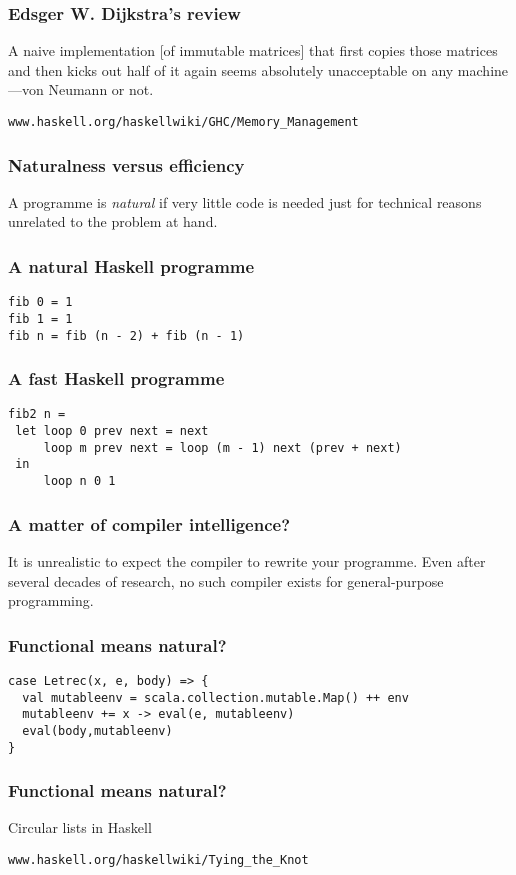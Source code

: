 \documentclass{beamer}
\begin{document}
\begin{frame}[fragile]
\frametitle{Edsger W. Dijkstra's review}
A naive implementation [of immutable matrices] that first copies those
matrices and then kicks out half of it again seems absolutely
unacceptable on any machine---von Neumann or not.

\pause
\begin{verbatim}
www.haskell.org/haskellwiki/GHC/Memory_Management
\end{verbatim}
\end{frame}

\begin{frame}
\frametitle{Naturalness versus efficiency}
A programme is \emph{natural} if very little code is needed just for
technical reasons unrelated to the problem at hand.
\end{frame}

\begin{frame}[fragile]
\frametitle{A natural Haskell programme}
\begin{verbatim}
fib 0 = 1
fib 1 = 1
fib n = fib (n - 2) + fib (n - 1)
\end{verbatim}
\end{frame}

\begin{frame}[fragile]
\frametitle{A fast Haskell programme}
\begin{verbatim}
fib2 n =
 let loop 0 prev next = next
     loop m prev next = loop (m - 1) next (prev + next)
 in
     loop n 0 1
\end{verbatim}
\end{frame}

\begin{frame}
\frametitle{A matter of compiler intelligence?}
It is unrealistic to expect the compiler to rewrite your programme.
Even after several decades of research, no such compiler exists for
general-purpose programming.
\end{frame}

\begin{frame}[fragile]
\frametitle{Functional means natural?}
\begin{verbatim}
case Letrec(x, e, body) => {
  val mutableenv = scala.collection.mutable.Map() ++ env
  mutableenv += x -> eval(e, mutableenv)
  eval(body,mutableenv)
}
\end{verbatim}
\end{frame}

\begin{frame}[fragile]
\frametitle{Functional means natural?}
Circular lists in Haskell

\begin{verbatim}
www.haskell.org/haskellwiki/Tying_the_Knot
\end{verbatim}
\end{frame}
\end{document}
